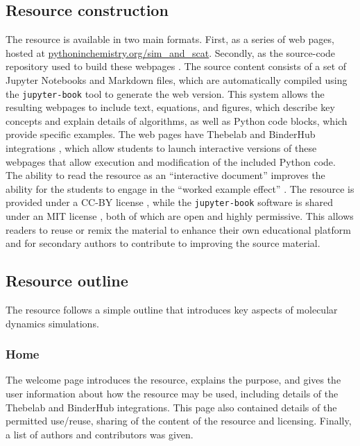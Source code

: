 \subsection{Resource construction}
The resource is available in two main formats.
First, as a series of web pages, hosted at \href{https://pythoninchemistry.org/sim_and_scat}{pythoninchemistry.org/sim\_and\_scat}.
Secondly, as the source-code repository used to build these webpages \cite{mccluskey_pythoninchemistry/sim_and_scat_2019}.
The source content consists of a set of Jupyter Notebooks and Markdown files, which are automatically compiled using the \texttt{jupyter-book} tool \cite{lau_jupyter/jupyter-book_2019} to generate the web version.
This system allows the resulting webpages to include text, equations, and figures, which describe key concepts and explain details of algorithms, as well as Python code blocks, which provide specific examples.
The web pages have Thebelab and BinderHub integrations \cite{ragan-kelley_minrk/thebelab_2019, ragan-kelley_jupyterhub/binderhub_2019, jupyter_binder_2018}, which allow students to launch interactive versions of these webpages that allow execution and modification of the included Python code.
The ability to read the resource as an ``interactive document'' improves the ability for the students to engage in the ``worked example effect'' \cite{tarmizi_guidance_1988}.
The resource is provided under a CC-BY license \cite{creative_commons_creative_2019}, while the \texttt{jupyter-book} software is shared under an MIT license \cite{open_source_mit_2019}, both of which are open and highly permissive.
This allows readers to reuse or remix the material to enhance their own educational platform and for secondary authors to contribute to improving the source material.

\subsection{Resource outline}
The resource follows a simple outline that introduces key aspects of molecular dynamics simulations.

\subsubsection{Home}
The welcome page introduces the resource, explains the purpose, and gives the user information about how the resource may be used, including details of the Thebelab and BinderHub integrations.
This page also contained details of the permitted use/reuse, sharing of the content of the resource and licensing.
Finally, a list of authors and contributors was given.

